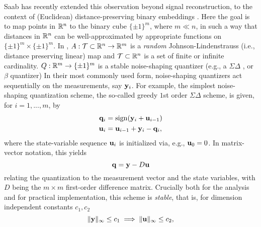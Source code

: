 Saab has recently  extended this observation beyond signal reconstruction, to the context of (Euclidean) distance-preserving binary embeddings \cite{huynh2018fast}. Here the goal is to map points in $\mathbb{R}^n$ to the binary cube $\{\pm 1\}^m$, where $m\ll n$, in such a way that  distances in $\mathbb{R}^n$ can be well-approximated by appropriate functions on $\{\pm 1\}^m \times \{\pm 1\}^m$. %
In \cite{huynh2018fast},  $A: \mathcal{T}\subset\mathbb{R}^n \to \mathbb{R}^m$ is a \emph{random} Johnson-Lindenstrauss \cite{johnson1984extensions} (i.e., distance preserving linear) map and  $\mathcal{T}\subset \mathbb{R}^n$ is a set of finite or infinite cardinality. $Q:\mathbb{R}^m \to \{\pm 1\}^m$ is a stable noise-shaping quantizer (e.g., a $\Sigma\Delta$ \cite{daubechies2003approximating}, or $\beta$ \cite{chou2016distributed} quantizer)
%
%
\iffalse In their most commonly used form, noise-shaping quantizers act sequentially on the measurements, say $\mathbf{y}_i$. 
For example, the simplest noise-shaping quantization scheme, the so-called greedy $1$st order $\Sigma\Delta$ scheme, is given, for $i=1,...,m$, by 
\begin{align}
    \mathbf{q}_i &= \mathrm{sign}(\mathbf{y}_i+\mathbf{u}_{i-1})\\
    \mathbf{u}_i &= \mathbf{u}_{i-1} + \mathbf{y}_i -\mathbf{q}_i,
\end{align}
where the state-variable sequence $\mathbf{u}_i$ is initialized via, e.g., $\mathbf{u}_0=0$. In matrix-vector notation, this yields  \begin{equation}\mathbf{q}=\mathbf{y} - D\mathbf{u}\label{eq:SD_state}\end{equation}  relating the quantization to the measurement vector and the state variables, with $D$ being the $m\times m$ first-order difference matrix. Crucially both for the analysis and for practical implementation, this scheme is \emph{stable}, that is, for dimension independent constants $c_1,c_2$
 \begin{equation}\|\mathbf{y}\|_\infty \leq c_1 \implies \|\mathbf{u}\|_\infty \leq c_2,\label{eq:stability}\end{equation}



